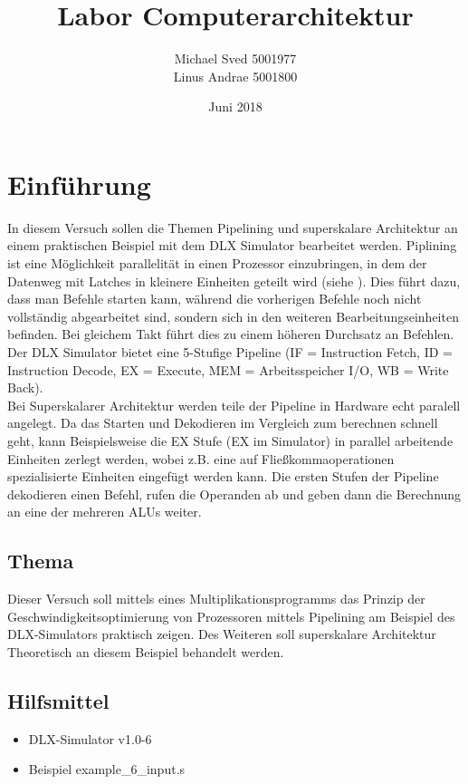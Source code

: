 \documentclass[a4paper,ngerman]{scrartcl}
\title{Labor Computerarchitektur}
\subtitle{\subtitletext}
\author{Michael Sved  5001977\\ Linus Andrae 5001800}
\date{Juni 2018}
\begin{document}

\newcommand{\einfuehrungstext}{In diesem Versuch sollen die Themen Pipelining und superskalare Architektur an einem praktischen Beispiel mit dem DLX Simulator bearbeitet werden. 
Piplining ist eine Möglichkeit parallelität in einen Prozessor einzubringen, in dem der Datenweg mit Latches in kleinere Einheiten geteilt wird (siehe \cite[S. 314]{TaneRech2014}). Dies führt dazu, dass man Befehle starten kann, während die vorherigen Befehle noch nicht vollständig abgearbeitet sind, sondern sich in den weiteren Bearbeitungseinheiten befinden.
Bei gleichem Takt führt dies zu einem höheren Durchsatz an Befehlen. \\
Der DLX Simulator bietet eine 5-Stufige Pipeline (IF = Instruction Fetch, ID = Instruction Decode, EX = Execute, MEM = Arbeitsspeicher I/O, WB = Write Back). \\
Bei Superskalarer Architektur werden teile der Pipeline in Hardware echt paralell angelegt. Da das Starten und Dekodieren im Vergleich zum berechnen schnell geht, kann Beispielsweise die EX Stufe (EX im Simulator) in parallel arbeitende Einheiten zerlegt werden, wobei z.B. eine auf Fließkommaoperationen spezialisierte Einheiten eingefügt werden kann. Die ersten Stufen der Pipeline dekodieren einen Befehl, rufen die Operanden ab und geben dann die Berechnung an eine der mehreren ALUs weiter. }


\maketitle
\thispagestyle{empty}
\tableofcontents
\newpage
\setcounter{page}{1}
\section{Einführung}
\einfuehrungstext
\subsection{Thema}
Dieser Versuch soll mittels eines Multiplikationsprogramms das Prinzip der Geschwindigkeitsoptimierung von Prozessoren mittels Pipelining am Beispiel des DLX-Simulators praktisch zeigen. 
Des Weiteren soll superskalare Architektur Theoretisch an diesem Beispiel behandelt werden. 

\subsection{Hilfsmittel}
\begin{itemize}
    \item DLX-Simulator v1.0-6
    \item Beispiel example\_6\_input.s
\end{itemize}
\end{document}
